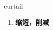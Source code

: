 
\begin{frame}
{\huge curtail}
\begin{center}
\begin{enumerate}\Large
  \item \textbf{缩短，削减}
\end{enumerate}
\end{center}
\end{frame}
